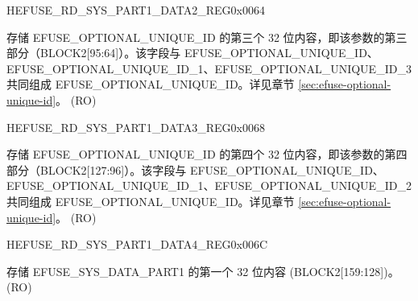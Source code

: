 \begin{register}{H}{EFUSE\_RD\_SYS\_PART1\_DATA2\_REG}{0x0064}\label{regdesc:EFUSERDSYSPART1DATA2REG}
%
\regnewline%
\begin{regdesc}\begin{reglist}
\label{fielddesc:EFUSEOPTIONALUNIQUEID2}\item [EFUSE\_OPTIONAL\_UNIQUE\_ID\_2] 存储 EFUSE\_OPTIONAL\_UNIQUE\_ID 的第三个 32 位内容，即该参数的第三部分（BLOCK2[95:64]）。该字段与 EFUSE\_OPTIONAL\_UNIQUE\_ID、EFUSE\_OPTIONAL\_UNIQUE\_ID\_1、EFUSE\_OPTIONAL\_UNIQUE\_ID\_3 共同组成 EFUSE\_OPTIONAL\_UNIQUE\_ID。详见章节 \ref{sec:efuse-optional-unique-id}。 (RO)
\end{reglist}\end{regdesc}
\end{register}


\begin{register}{H}{EFUSE\_RD\_SYS\_PART1\_DATA3\_REG}{0x0068}\label{regdesc:EFUSERDSYSPART1DATA3REG}
%
\regnewline%
\begin{regdesc}\begin{reglist}
\label{fielddesc:EFUSEOPTIONALUNIQUEID3}\item [EFUSE\_OPTIONAL\_UNIQUE\_ID\_3] 存储 EFUSE\_OPTIONAL\_UNIQUE\_ID 的第四个 32 位内容，即该参数的第四部分（BLOCK2[127:96]）。该字段与 EFUSE\_OPTIONAL\_UNIQUE\_ID、EFUSE\_OPTIONAL\_UNIQUE\_ID\_1、EFUSE\_OPTIONAL\_UNIQUE\_ID\_2 共同组成 EFUSE\_OPTIONAL\_UNIQUE\_ID。详见章节 \ref{sec:efuse-optional-unique-id}。 (RO)
\end{reglist}\end{regdesc}
\end{register}


\begin{register}{H}{EFUSE\_RD\_SYS\_PART1\_DATA4\_REG}{0x006C}\label{regdesc:EFUSERDSYSPART1DATA4REG}
%
\regnewline%
\begin{regdesc}\begin{reglist}
\label{fielddesc:EFUSESYSDATAPART14}\item [EFUSE\_SYS\_DATA\_PART1\_4] 存储 EFUSE\_SYS\_DATA\_PART1 的第一个 32 位内容 (BLOCK2[159:128])。 (RO)
\end{reglist}\end{regdesc}
\end{register}


